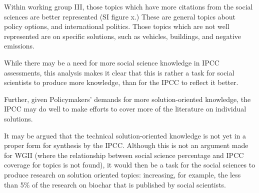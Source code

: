 \documentclass{article}
\begin{document}
Within working group III, those topics which have more citations from the social sciences are better represented (SI figure x.) These are general topics about policy options, and international politics. Those topics which are not well represented are on specific solutions, such as vehicles, buildings, and negative emissions. 

While there may be a need for more social science knowledge in IPCC assessments, this analysis makes it clear that this is rather a task for social scientists to produce more knowledge, than for the IPCC to reflect it better. 

Further, given Policymakers' demands for more solution-oriented knowledge, the IPCC may do well to make efforts to cover more of the literature on individual solutions.

It may be argued that the technical solution-oriented knowledge is not yet in a proper form for synthesis by the IPCC. Although this is not an argument made for WGII (where the relationship between social science percentage and IPCC coverage for topics is not found), it would then be a task for the social sciences to produce research on solution oriented topics: increasing, for example, the less than 5\% of the research on biochar that is published by social scientists.
\end{document}
